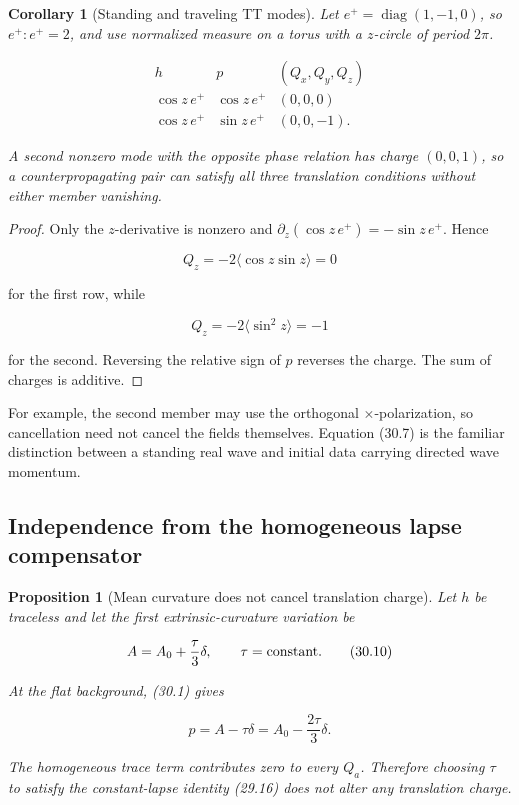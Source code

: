 \documentclass[11pt]{article}
\newtheorem{proposition}[theorem]{Proposition}
\newtheorem{corollary}[theorem]{Corollary}
\theoremstyle{remark}
\begin{document}
\begin{corollary}[Standing and traveling TT modes]
\label{cor:v19v27-waves}
Let \(e^+=\operatorname{diag}(1,-1,0)\), so
\(e^+:e^+=2\), and use normalized measure on a torus with a \(z\)-circle
of period \(2\pi\).

\[
\begin{array}{c|c|c}
h&p&(Q_x,Q_y,Q_z)\\ \hline
\cos z\,e^+&\cos z\,e^+&(0,0,0)\\
\cos z\,e^+&\sin z\,e^+&(0,0,-1).
\end{array}                                                     \tag{30.9}
\]

A second nonzero mode with the opposite phase relation has charge
\((0,0,1)\), so a counterpropagating pair can satisfy all three
translation conditions without either member vanishing.
\end{corollary}

\begin{proof}
Only the \(z\)-derivative is nonzero and
\(\partial_z(\cos z\,e^+)=-\sin z\,e^+\).  Hence

\[
 Q_z=-2\langle\cos z\sin z\rangle=0
\]

for the first row, while

\[
 Q_z=-2\langle\sin^2z\rangle=-1
\]

for the second.  Reversing the relative sign of \(p\) reverses the
charge.  The sum of charges is additive.
\end{proof}

For example, the second member may use the orthogonal
\(\times\)-polarization, so cancellation need not cancel the fields
themselves.  Equation (30.7) is the familiar distinction between a
standing real wave and initial data carrying directed wave momentum.

\subsection{Independence from the homogeneous lapse compensator}

\begin{proposition}[Mean curvature does not cancel translation charge]
\label{prop:v19v27-independent}
Let \(h\) be traceless and let the first extrinsic-curvature variation be

\[
 A=A_0+\frac{\tau}{3}\delta,\qquad \tau=\hbox{constant}.       \tag{30.10}
\]

At the flat background, (30.1) gives

\[
 p=A-\tau\delta=A_0-\frac{2\tau}{3}\delta.                    \tag{30.11}
\]

The homogeneous trace term contributes zero to every \(Q_a\).  Therefore
choosing \(\tau\) to satisfy the constant-lapse identity (29.16) does not
alter any translation charge.
\end{proposition}
\end{document}
